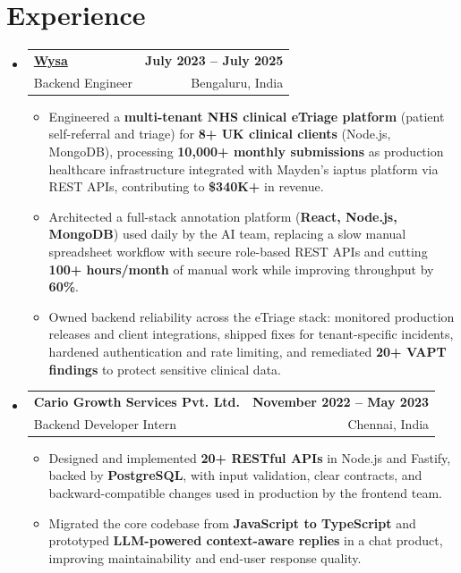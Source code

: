 \documentclass[letterpaper,10pt]{article}
\makeatletter
\newcommand{\resumeItem}[1]{
  \item\small{#1\vspace{-1pt}}
}
\newcommand{\resumeSubheading}[4]{
  \vspace{1pt}\item
    \begin{tabular*}{0.985\textwidth}[t]{l@{\extracolsep{\fill}}r}
      \textbf{#1} & \textbf{\small #2} \\
      {\small\color{ResumeSlate} #3} & {\small\color{ResumeSlate} #4} \\
    \end{tabular*}\vspace{-6pt}
}
\newcommand{\resumeSubHeadingListStart}{\begin{itemize}[leftmargin=0.0in, label={}, itemsep=2pt, topsep=2pt]}
\newcommand{\resumeSubHeadingListEnd}{\end{itemize}}
\newcommand{\resumeItemListStart}{\begin{itemize}[leftmargin=0.18in, itemsep=2pt, topsep=1pt]}
\newcommand{\resumeItemListEnd}{\end{itemize}\vspace{-4pt}}
\makeatother
\begin{document}
\section{Experience}
\resumeSubHeadingListStart
  \resumeSubheading
    {\href{https://www.wysa.io}{Wysa}}{July 2023 -- July 2025}
    {Backend Engineer}{Bengaluru, India}
    \resumeItemListStart
      \resumeItem{Engineered a \textbf{multi-tenant NHS clinical eTriage platform} (patient self-referral and triage) for \textbf{8+ UK clinical clients} (Node.js, MongoDB), processing \textbf{10{,}000+ monthly submissions} as production healthcare infrastructure integrated with Mayden's iaptus platform via REST APIs, contributing to \textbf{\$340K+} in revenue.}
      \resumeItem{Architected a full-stack annotation platform (\textbf{React, Node.js, MongoDB}) used daily by the AI team, replacing a slow manual spreadsheet workflow with secure role-based REST APIs and cutting \textbf{100+ hours/month} of manual work while improving throughput by \textbf{60\%}.}
      \resumeItem{Owned backend reliability across the eTriage stack: monitored production releases and client integrations, shipped fixes for tenant-specific incidents, hardened authentication and rate limiting, and remediated \textbf{20+ VAPT findings} to protect sensitive clinical data.}
    \resumeItemListEnd
  \resumeSubheading
    {Cario Growth Services Pvt. Ltd.}{November 2022 -- May 2023}
    {Backend Developer Intern}{Chennai, India}
    \resumeItemListStart
      \resumeItem{Designed and implemented \textbf{20+ RESTful APIs} in Node.js and Fastify, backed by \textbf{PostgreSQL}, with input validation, clear contracts, and backward-compatible changes used in production by the frontend team.}
      \resumeItem{Migrated the core codebase from \textbf{JavaScript to TypeScript} and prototyped \textbf{LLM-powered context-aware replies} in a chat product, improving maintainability and end-user response quality.}
    \resumeItemListEnd
\resumeSubHeadingListEnd
\vspace{-4pt}
\end{document}
